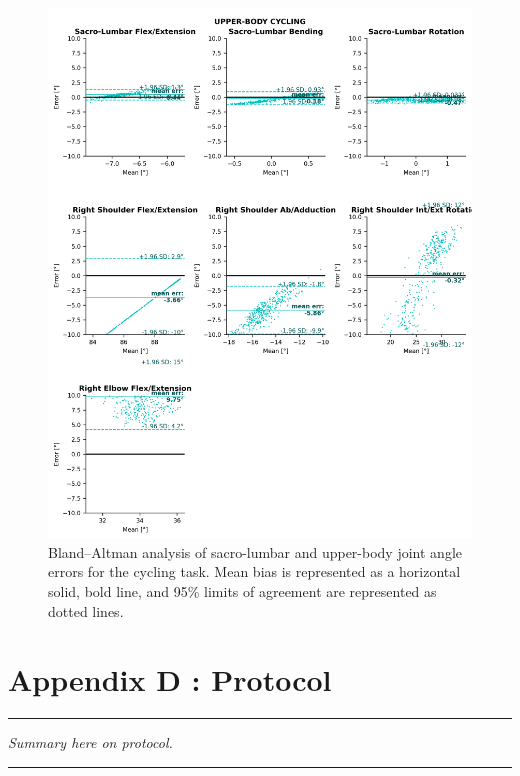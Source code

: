 \begin{figure}[!ht]
	\centering
	\def\svgwidth{1\columnwidth}
	\fontsize{10pt}{10pt}\selectfont
	\includegraphics[height=\dimexpr\textheight-119pt]{"../Annexes/Figures/Fig_BlandBikeUp.png"}
	\caption{Bland–Altman analysis of sacro-lumbar and upper-body joint angle errors for the cycling task. Mean bias is represented as a horizontal solid, bold line, and 95\% limits of agreement are represented as dotted lines.}
	\label{fig_blandbikeup}
\end{figure}


\FloatBarrier
\chapter{Appendix D : Protocol}
\label{Ann:3}


\begin{center}
\rule{0.7\linewidth}{.5pt}
\begin{minipage}{0.7\linewidth}
\smallskip

\textit{Summary here on protocol.
}

\end{minipage}
\smallskip
\rule{0.7\linewidth}{.5pt}
\end{center}

